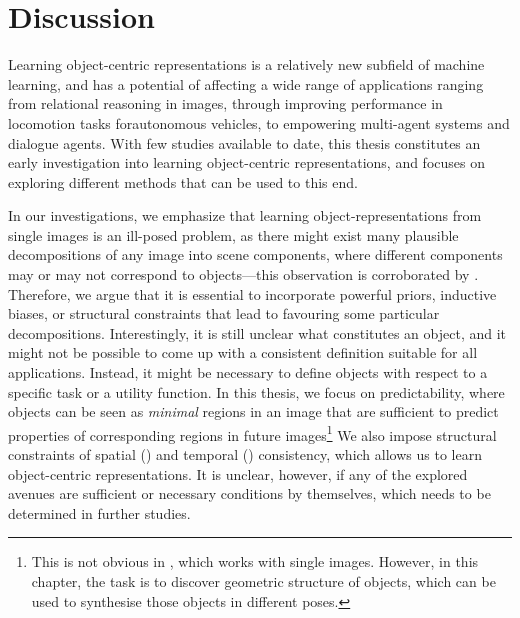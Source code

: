 \chapter{Discussion}
\label{ch:discussion}


Learning object-centric representations is a relatively new subfield of machine learning, and has a potential of affecting a wide range of applications ranging from relational reasoning in images, through improving performance in locomotion tasks for\eg autonomous vehicles, to empowering multi-agent systems and dialogue agents.
With few studies available to date, this thesis constitutes an early investigation into learning object-centric representations, and focuses on exploring different methods that can be used to this end.

In our investigations, we emphasize that learning object-representations from single images is an ill-posed problem, as there might exist many plausible decompositions of any image into scene components, where different components may or may not correspond to objects---this observation is corroborated by \cite{Burgess2019monet,Greff2019multi,Engelcke2019genesis}.
Therefore, we argue that it is essential to incorporate powerful priors, inductive biases, or structural constraints that lead to favouring some particular decompositions.
Interestingly, it is still unclear what constitutes an object, and it might not be possible to come up with a consistent definition suitable for all applications.
Instead, it might be necessary to define objects with respect to a specific task or a utility function.
In this thesis, we focus on predictability, where objects can be seen as \textit{minimal} regions in an image that are sufficient to predict properties of corresponding regions in future images\footnote{This is not obvious in , which works with single images. However, in this chapter, the task is to discover geometric structure of objects, which can be used to synthesise those objects in different poses.} 
We also impose structural constraints of spatial () and temporal () consistency, which allows us to learn object-centric representations.
It is unclear, however, if any of the explored avenues are sufficient or necessary conditions by themselves, which needs to be determined in further studies. 

